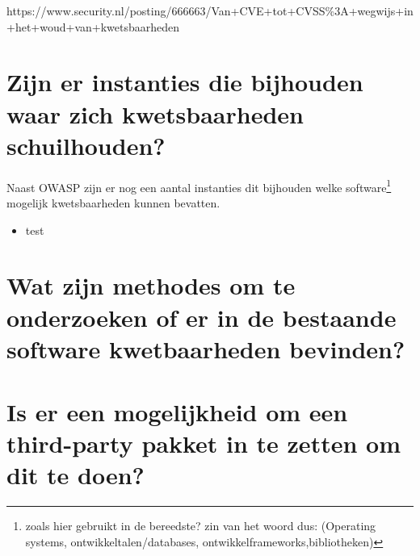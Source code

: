 https://www.security.nl/posting/666663/Van+CVE+tot+CVSS\%3A+wegwijs+in+het+woud+van+kwetsbaarheden










\section{Zijn er instanties die bijhouden waar zich kwetsbaarheden schuilhouden?}

Naast OWASP zijn er nog een aantal instanties dit bijhouden welke software\footnote{zoals hier gebruikt in de bereedste? zin van het woord dus: (Operating systems, ontwikkeltalen/databases, ontwikkelframeworks,bibliotheken) }
mogelijk kwetsbaarheden kunnen bevatten.
\begin{itemize}
    \item test
\end{itemize}


\section{Wat zijn methodes om te onderzoeken of er in de bestaande software kwetbaarheden bevinden?}

\section{Is er een mogelijkheid om een third-party pakket in te zetten om dit te doen?}
